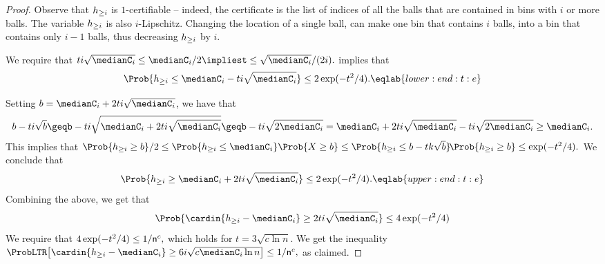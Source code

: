 \begin{proof}
    Observe that $h_{\geq i}$ is $1$-certifiable -- indeed, the
    certificate is the list of indices of all the balls that are
    contained in bins with $i$ or more balls. The variable $h_{\geq i}$
    is also $i$-Lipschitz. Changing the location of a single ball, can
    make one bin that contains $i$ balls, into a bin that contains
    only $i-1$ balls, thus decreasing $h_{\geq i}$ by $i$.

    We require that
    \begin{math}
        ti\sqrt{ \medianC_i} \leq \medianC_i/2%
        \implies%
        t \leq \sqrt{ \medianC_i}/(2i).%
    \end{math}    
     implies that
    \begin{equation}
        \Prob{ \NHX{i} \leq  \medianC_i - ti\sqrt{ \medianC_i}}%
        \leq 2\exp(-t^2/4).
        \eqlab{lower:end:t:e}
    \end{equation}

    Setting $b = \medianC_i + 2 ti\sqrt{\medianC_i}$, we have that
    \begin{equation*}
        b- ti\sqrt{b}%
        \geq%
        b - ti \sqrt{\medianC_i + 2 ti\sqrt{\medianC_i}} 
        \geq%
        b - ti \sqrt{2 \medianC_i} %
        =%
        \medianC_i + 2 ti\sqrt{\medianC_i} - ti \sqrt{2 \medianC_i}%
        \geq%
        \medianC_i.        
    \end{equation*}
    This implies that
    \begin{math}
        \Prob{ \NHX{i} \geq b} /2%
        \leq %
        \Prob{ \NHX{i} \leq \medianC_i} \Prob{X \geq b}%
        \leq %
        \Prob{ \NHX{i} \leq b- tk\sqrt{b}}%
        \!\Prob{\NHX{i} \geq b} \leq \exp(-t^2/4).
    \end{math}
    We conclude that
    \begin{equation}
        \Prob{ \NHX{i} \geq \medianC_i + 2 ti\sqrt{\medianC_i}}%
        \leq 2 \exp(-t^2/4).
        \eqlab{upper:end:t:e}
    \end{equation}
    Combining the above, we get that
    \begin{equation*}
        \Prob{ \cardin{\NHX{i} - \medianC_i} \geq
           2ti\sqrt{\medianC_i}}%
        \leq 4 \exp(-t^2/4)
    \end{equation*}
    We require that 
    \begin{math}
        4 \exp(-t^2/4) \leq {1}/{\mathsf{n}^{c}},
    \end{math}
    which holds for $ t= 3\sqrt{c \ln n}$.
    We get the inequality
    \begin{math}
        \ProbLTR \bigl[ \cardin{\NHX{i} - \medianC_i} \geq 6 i\sqrt{c
           \medianC_i \ln n} \bigr]%
        \leq {1}/{\nballs^{c}},
    \end{math}
    as claimed.
    

\end{proof}
